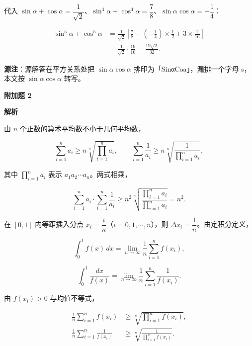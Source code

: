 \begin{answer}
代入 $\sin\alpha+\cos\alpha=\dfrac1{\sqrt2}$、$\sin^4\alpha+\cos^4\alpha=\dfrac78$、$\sin\alpha\cos\alpha=-\dfrac14$：

\nopagebreak[4]
\[
\begin{aligned}
\sin^5\alpha+\cos^5\alpha
&=\frac1{\sqrt2}\left[\frac78-\left(-\frac14\right)\times\frac12+3\times\frac1{16}\right]\\
&=\frac1{\sqrt2}\cdot\frac{19}{16}
=\frac{19\sqrt2}{32}.
\end{aligned}
\]

\begin{gktip}
\textbf{源注}：源解答在平方关系处把 $\sin\alpha\cos\alpha$ 排印为「SinαCoa」，漏排一个字母 s，本文按 $\sin\alpha\cos\alpha$ 转写。
\end{gktip}

\textbf{附加题 2}

\textbf{解析}


由 $n$ 个正数的算术平均数不小于几何平均数，

\nopagebreak[4]
\[
\sum_{i=1}^{n}a_i\ge n\sqrt[n]{\prod_{i=1}^{n}a_i},
\qquad
\sum_{i=1}^{n}\frac1{a_i}\ge n\sqrt[n]{\frac1{\prod_{i=1}^{n}a_i}},
\]

其中 $\prod_{i=1}^{n}a_i$ 表示 $a_1a_2\cdots a_n$。两式相乘，

\nopagebreak[4]
\[
\sum_{i=1}^{n}a_i\cdot\sum_{i=1}^{n}\frac1{a_i}
\ge n^2\sqrt[n]{\frac{\prod_{i=1}^{n}a_i}{\prod_{i=1}^{n}a_i}}
=n^2.
\]


在 $[0,1]$ 内等距插入分点 $x_i=\dfrac{i}{n}$（$i=0,1,\cdots,n$），则 $\Delta x_i=\dfrac1n$。由定积分定义，

\nopagebreak[4]
\[
\int_0^1 f(x)\,dx=\lim_{n\to\infty}\frac1n\sum_{i=1}^{n}f(x_i),
\]

\nopagebreak[4]
\[
\int_0^1\frac{dx}{f(x)}=\lim_{n\to\infty}\frac1n\sum_{i=1}^{n}\frac1{f(x_i)}.
\]

由 $f(x_i)>0$ 与均值不等式，

\nopagebreak[4]
\[
\begin{aligned}
\frac1n\sum_{i=1}^{n}f(x_i)
&\ge\sqrt[n]{\prod_{i=1}^{n}f(x_i)},\\
\frac1n\sum_{i=1}^{n}\frac1{f(x_i)}
&\ge\sqrt[n]{\frac1{\prod_{i=1}^{n}f(x_i)}}.
\end{aligned}
\]


\end{answer}
